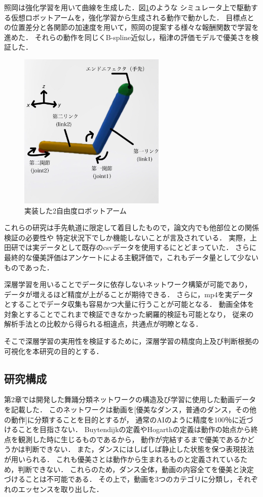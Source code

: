 照岡\cite{teruoka}は強化学習を用いて曲線を生成した．図\ref{robot_arm}のような
シミュレータ上で駆動する仮想ロボットアームを，強化学習から生成される動作で動かした．
目標点との位置差分と各関節の加速度を用いて，照岡の提案する様々な報酬関数で学習を進めた．
それらの動作を同じくB-spline近似し，稲津の評価モデルで優美さを検証した．

\begin{figure}[b]
  \begin{center}
    \includegraphics[width=70mm]{images/quote/robot_arm.png}
  \end{center}
  \caption{実装した2自由度ロボットアーム}
  \label{robot_arm}
\end{figure}
\clearpage

これらの研究は手先軌道に限定して着目したもので，論文内でも他部位との関係検証の必要性や
特定状況下でしか機能しないことが言及されている．
実際，上田研では実データとして既存のcsvデータを使用するにとどまっていた．
さらに最終的な優美評価はアンケートによる主観評価で，これもデータ量として少ないものであった．

深層学習を用いることでデータに依存しないネットワーク構築が可能であり，
データが増えるほど精度が上がることが期待できる．
さらに，mp4を実データとすることでデータ収集も容易かつ大量に行うことが可能となる．
動画全体を対象とすることでこれまで検証できなかった網羅的検証も可能となり，
従来の解析手法との比較から得られる相違点，共通点が明瞭となる．

そこで深層学習の実用性を検証するために，深層学習の精度向上及び判断根拠の可視化を本研究の目的とする．

\subsection{研究構成}
第2章では開発した舞踊分類ネットワークの構造及び学習に使用した動画データを記載した．
このネットワークは動画を[優美なダンス，普通のダンス，その他の動作]に分類することを目的とするが，
通常のAIのように精度を100％に近づけることを目指さない．
Buytendijkの定義やHogarthの定義は動作の始点から終点を観測した時に生じるものであるから，
動作が完結するまで優美であるかどうかは判断できない．
また，ダンスにはしばしば静止した状態を保つ表現技法が用いられる．
これも優美さとは動作から生まれるものと定義されているため，判断できない．
これらのため，ダンス全体，動画の内容全てを優美と決定づけることは不可能である．
その上で，動画を3つのカテゴリに分類し，それぞれのエッセンスを取り出した．

